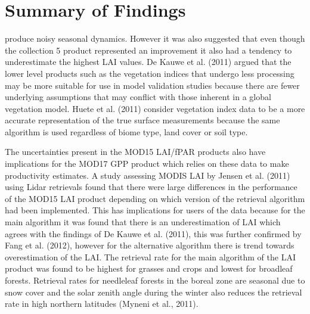 \section{Summary of Findings}
produce noisy seasonal dynamics. However it was also suggested that even though the collection 5 product represented an improvement it also had a tendency to underestimate the highest LAI values. De Kauwe et al. (2011) argued that the lower level products such as the vegetation indices that undergo less processing may be more suitable for use in model validation studies because there are fewer underlying assumptions that may conflict with those inherent in a global vegetation model. Huete et al. (2011) consider vegetation index data to be a more accurate representation of the true surface measurements because the same algorithm is used regardless of biome type, land cover or soil type.

The uncertainties present in the MOD15 LAI/fPAR products also have implications for the MOD17 GPP product which relies on these data to make productivity estimates. A study assessing MODIS LAI by Jensen et al. (2011) using Lidar retrievals found that there were large differences in the performance of the MOD15 LAI product depending on which version of the retrieval algorithm had been implemented. This has implications for users of the data because for the main algorithm it was found that there is an underestimation of LAI which agrees with the findings of De Kauwe et al. (2011), this was further confirmed by Fang et al. (2012), however for the alternative algorithm there is trend towards overestimation of the LAI. The retrieval rate for the main algorithm of the LAI
product was found to be highest for grasses and crops and lowest for broadleaf forests. Retrieval rates for needleleaf forests in the boreal zone are seasonal due to snow cover and the solar zenith angle during the winter also reduces the retrieval rate in high northern latitudes (Myneni et al., 2011).

